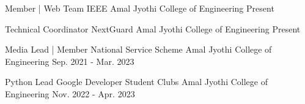 
\begin{cventries}
  \cventry
    {Member | Web Team} %
    {IEEE} %
    {Amal Jyothi College of Engineering}
    {Present} %
    {}
\end{cventries}
\vspace{-1.5\baselineskip}
\begin{cventries}
  \cventry
    {Technical Coordinator} %
    {NextGuard} %
    {Amal Jyothi College of Engineering}
    {Present} %
    {}
\end{cventries}
\vspace{-1.5\baselineskip}
\begin{cventries}
  \cventry
    {Media Lead | Member} %
    {National Service Scheme} %
    {Amal Jyothi College of Engineering}
    {Sep. 2021 - Mar. 2023} %
    {}
\end{cventries}
\vspace{-1.5\baselineskip}
\begin{cventries}
  \cventry
    {Python Lead} %
    {Google Developer Student Clubs} %
    {Amal Jyothi College of Engineering}
    {Nov. 2022 - Apr. 2023} %
    {}
\end{cventries}
